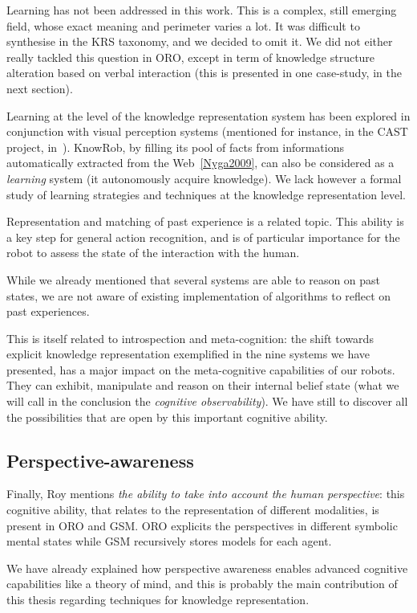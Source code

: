 Learning has not been addressed in this work. This is a complex, still emerging
field, whose exact meaning and perimeter varies a lot. It was difficult to
synthesise in the KRS taxonomy, and we decided to omit it. We did not either
really tackled this question in ORO, except in term of knowledge structure
alteration based on verbal interaction (this is presented in one case-study, in
the next section).

Learning at the level of the knowledge representation system has been explored
in conjunction with visual perception systems (mentioned for instance, in the
CAST project, in~\cite{Jakobsson2008}). {\sc KnowRob}, by filling its pool of
facts from informations automatically extracted from the Web~\ref{Nyga2009},
can also be considered as a \emph{learning} system (it autonomously acquire
knowledge). We lack however a formal study of learning strategies and
techniques at the knowledge representation level.

Representation and matching of past experience is a related topic. This ability
is a key step for general action recognition, and is of particular importance
for the robot to assess the state of the interaction with the human.

While we already mentioned that several systems are able to reason on past
states, we are not aware of existing implementation of algorithms to reflect on
past experiences.

This is itself related to introspection and meta-cognition: the shift towards
explicit knowledge representation exemplified in the nine systems we have
presented, has a major impact on the meta-cognitive capabilities of our robots.
They can exhibit, manipulate and reason on their internal belief state (what we
will call in the conclusion the \emph{cognitive observability}). We have still
to discover all the possibilities that are open by this important cognitive
ability.

\subsection{Perspective-awareness}

Finally, Roy mentions \emph{the ability to take into account the human
perspective}: this cognitive ability, that relates to the representation of
different modalities, is present in ORO and GSM. ORO explicits the perspectives
in different symbolic mental states while GSM recursively stores models for
each agent.

We have already explained how perspective awareness enables advanced cognitive
capabilities like a theory of mind, and this is probably the main contribution
of this thesis regarding techniques for knowledge representation.



